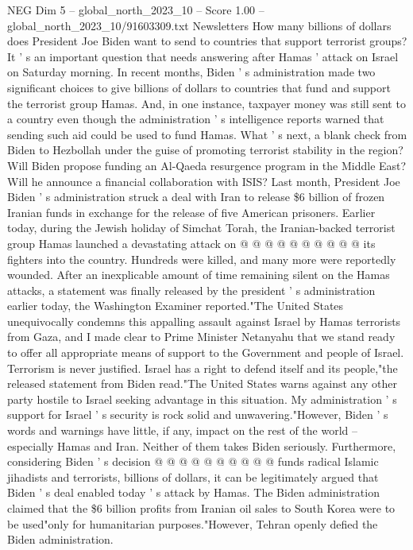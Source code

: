 \begin{textsample}{NEG Dim 5 – global\_north\_2023\_10 – Score 1.00 – global\_north\_2023\_10/91603309.txt}  \label{ex:f5_neg_029}
Newsletters How many billions of dollars does President Joe Biden want to send to countries that support terrorist groups?
It ' s an important question that needs answering after Hamas ' attack on Israel on Saturday morning.
In recent months, Biden ' s administration made two significant choices to give billions of dollars to countries that fund and support the terrorist group Hamas.
And, in one instance, taxpayer money was still sent to a country even though the administration ' s intelligence reports warned that sending such aid could be used to fund Hamas.
What ' s next, a blank check from Biden to Hezbollah under the guise of promoting terrorist stability in the region?
Will Biden propose funding an Al-Qaeda resurgence program in the Middle East?
Will he announce a financial collaboration with ISIS?
Last month, President Joe Biden ' s administration struck a deal with Iran to release \$6 billion of frozen Iranian funds in exchange for the release of five American prisoners.
Earlier today, during the Jewish holiday of Simchat Torah, the Iranian-backed terrorist group Hamas launched a devastating attack on @ @ @ @ @ @ @ @ @ @ its fighters into the country.
Hundreds were killed, and many more were reportedly wounded.
After an inexplicable amount of time remaining silent on the Hamas attacks, a statement was finally released by the president ' s administration earlier today, the Washington Examiner reported."The United States unequivocally condemns this appalling assault against Israel by Hamas terrorists from Gaza, and I made clear to Prime Minister Netanyahu that we stand ready to offer all appropriate means of support to the Government and people of Israel.
Terrorism is never justified.
Israel has a right to defend itself and its people,"the released statement from Biden read."The United States warns against any other party hostile to Israel seeking advantage in this situation.
My administration ' s support for Israel ' s security is rock solid and unwavering."However, Biden ' s words and warnings have little, if any, impact on the rest of the world -- especially Hamas and Iran.
Neither of them takes Biden seriously.
Furthermore, considering Biden ' s decision @ @ @ @ @ @ @ @ @ @ funds radical Islamic jihadists and terrorists, billions of dollars, it can be legitimately argued that Biden ' s deal enabled today ' s attack by Hamas.
The Biden administration claimed that the \$6 billion profits from Iranian oil sales to South Korea were to be used"only for humanitarian purposes."However, Tehran openly defied the Biden administration.

\end{textsample}
